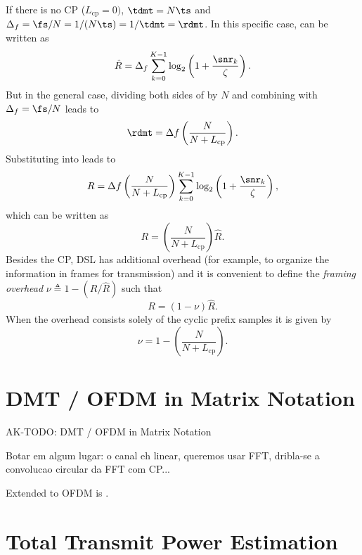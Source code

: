 If there is no CP ($L_{\textrm{cp}}=0)$, $\tdmt = N \ts$ and $\Delta_f = \fs/N = 1/(N \ts) = 1/\tdmt = \rdmt$. In this specific case, 
 can be written as
\begin{equation}
\hat R = \Delta_f \sum_{k=0}^{K-1} \log_2 \left(1 + \frac{\snr_k}{\zeta}\right). 
\label{eq:rate2}
\end{equation}
But in the general case, dividing both sides of  by $N$ and combining with $\Delta_f = \fs/N$ leads to
\begin{equation}
 \rdmt = \Delta f \left(\frac {N} {N+L_{\textrm{cp}}} \right).
\label{eq:dmt_delta_f_rdmt}
\end{equation}
Substituting  into  leads to
\begin{equation}
R = \Delta f \left(\frac {N} {N+L_{\textrm{cp}}} \right) \sum_{k=0}^{K-1} \log_2 \left(1 + \frac{\snr_k}{\zeta}\right),
\label{eq:rate3}
\end{equation}
which can be written as
\[
R = \left(\frac {N} {N+L_{\textrm{cp}}} \right) \hat R.
\]
Besides the CP, DSL has additional overhead (for example, to organize the information in frames for transmission) and it is convenient to define the \emph{framing overhead} $\nu \triangleq 1 - (R/{\hat R})$ such that
\begin{equation}
R = (1 - \nu) \hat R.
\label{eq:overhead}
\end{equation}
When the overhead consists solely of the cyclic prefix samples it is given by
\[
\nu = 1 - \left(\frac {N} {N+L_{\textrm{cp}}} \right).
\]

\section{DMT / OFDM in Matrix Notation}

AK-TODO: DMT / OFDM in Matrix Notation

Botar em algum lugar: o canal eh linear, queremos usar FFT, dribla-se a convolucao circular da FFT com CP...

Extended  to OFDM is .


\section{Total Transmit Power Estimation}

